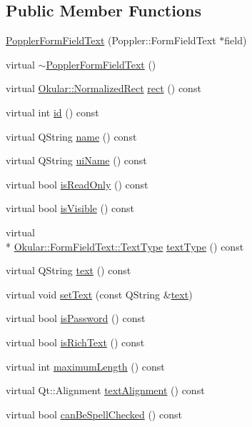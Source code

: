 \subsection*{Public Member Functions}
\begin{DoxyCompactItemize}
\item 
\hyperlink{classPopplerFormFieldText_af634a60991feb2b9d0f8f6c94096b8ad}{Poppler\+Form\+Field\+Text} (Poppler\+::\+Form\+Field\+Text $\ast$field)
\item 
virtual \hyperlink{classPopplerFormFieldText_a49d097b3306c0f51f3c4d3119f0fe13a}{$\sim$\+Poppler\+Form\+Field\+Text} ()
\item 
virtual \hyperlink{classOkular_1_1NormalizedRect}{Okular\+::\+Normalized\+Rect} \hyperlink{classPopplerFormFieldText_a613a015b6d8456d910bb233de44f8282}{rect} () const 
\item 
virtual int \hyperlink{classPopplerFormFieldText_ac6039f6801a6db67be2543f2d9a4c24f}{id} () const 
\item 
virtual Q\+String \hyperlink{classPopplerFormFieldText_a25ba5c843850a89de48c5e9536bd3d5c}{name} () const 
\item 
virtual Q\+String \hyperlink{classPopplerFormFieldText_a240433926716b251cd71d75ccfa07a98}{ui\+Name} () const 
\item 
virtual bool \hyperlink{classPopplerFormFieldText_a4846eab782ad4869edac932f4a0ef9de}{is\+Read\+Only} () const 
\item 
virtual bool \hyperlink{classPopplerFormFieldText_a3ca915ea23ad96b9a77a2eeb36bcaa39}{is\+Visible} () const 
\item 
virtual \\*
\hyperlink{classOkular_1_1FormFieldText_a13b763ea02b44247df564b79996671ba}{Okular\+::\+Form\+Field\+Text\+::\+Text\+Type} \hyperlink{classPopplerFormFieldText_a293e5c7c0851ad1f383c36775fe46b9a}{text\+Type} () const 
\item 
virtual Q\+String \hyperlink{classPopplerFormFieldText_a5209392f5dce00b6c8dda8955d44a8ae}{text} () const 
\item 
virtual void \hyperlink{classPopplerFormFieldText_a92c704dc8924516f7962884a66e01f8f}{set\+Text} (const Q\+String \&\hyperlink{classPopplerFormFieldText_a5209392f5dce00b6c8dda8955d44a8ae}{text})
\item 
virtual bool \hyperlink{classPopplerFormFieldText_a59ff5d5540af224aa20ca27dae4116aa}{is\+Password} () const 
\item 
virtual bool \hyperlink{classPopplerFormFieldText_a4f67011b791a3c1c550ea60289bb66af}{is\+Rich\+Text} () const 
\item 
virtual int \hyperlink{classPopplerFormFieldText_abfb39d92f325f14e11cccc9169108caa}{maximum\+Length} () const 
\item 
virtual Qt\+::\+Alignment \hyperlink{classPopplerFormFieldText_ab7b918783d8793dfa2c3f952285d0013}{text\+Alignment} () const 
\item 
virtual bool \hyperlink{classPopplerFormFieldText_a98d28ae15bfc391608c7e9f769717b62}{can\+Be\+Spell\+Checked} () const 
\end{DoxyCompactItemize}
